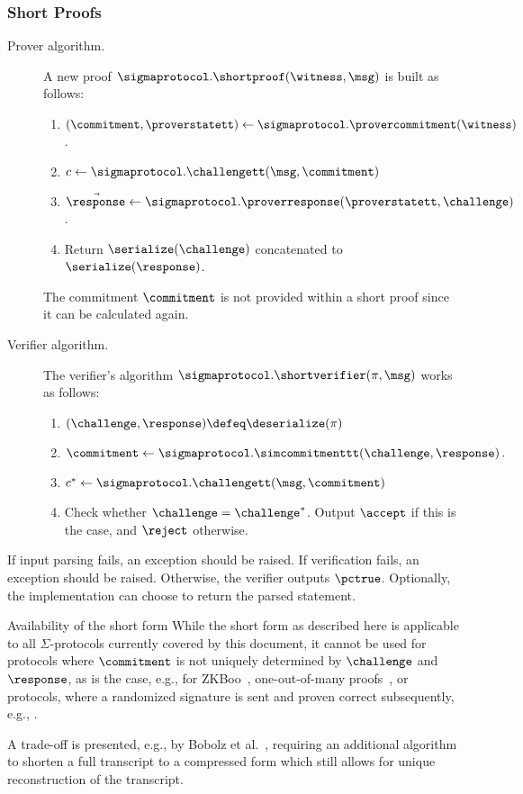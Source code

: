 \documentclass[11pt]{article}
\begin{document}
\subsubsection{Short Proofs}\label{sec:shortproof}
\begin{description}
\item[Prover algorithm.]
A new proof $\sigmaprotocol.\shortproof(\witness, \msg)$ is built as follows:
\begin{enumerate}
  \item
     $(\commitment,\proverstatett)\gets\sigmaprotocol.\provercommitment(\witness)$.
  \item
   $c \gets \sigmaprotocol.\challengett(\msg,  \commitment)$
  \item
     $\vec \response\gets\sigmaprotocol.\proverresponse(\proverstatett,\challenge)$.
  \item
  Return $\serialize(\challenge)$ concatenated to $\serialize(\response)$.
\end{enumerate}
The commitment $\commitment$ is not provided within a short proof since it can be calculated again.
\item[Verifier algorithm.] The verifier's algorithm $\sigmaprotocol.\shortverifier(\pi, \msg)$ works as follows:
\begin{enumerate}
  \item $(\challenge, \response) \defeq \deserialize(\pi)$
  \item $\commitment \gets \sigmaprotocol.\simcommitmenttt(\challenge, \response)\,.$
  \item $c^* \gets \sigmaprotocol.\challengett(\msg, \commitment)$
  \item
  Check whether $\challenge=\challenge^*$.
  Output $\accept$ if this is the case, and $\reject$ otherwise.
\end{enumerate}
\end{description}

If input parsing fails, an exception should be raised.
If verification fails, an exception should be raised.
Otherwise, the verifier outputs $\pctrue$. Optionally, the implementation can choose to return the parsed statement.

\begin{remark}{Availability of the short form}{}
  While the short form as described here is applicable to all $\Sigma$-protocols currently covered by this document, it cannot be used for protocols where $\commitment$ is not uniquely determined by $\challenge$ and $\response$, as is the case, e.g., for ZKBoo~\cite{USENIX:GiaMadOrl16}, one-out-of-many proofs~\cite{EC:GroKoh15}, or protocols, where a randomized signature is sent and proven correct subsequently, e.g., \cite{RSA:PoiSan16,AC:CamChaShe08}.

  A trade-off is presented, e.g., by Bobolz et al.~\cite{EPRINT:BEHF21}, requiring an additional algorithm to shorten a full transcript to a compressed form which still allows for unique reconstruction of the transcript.
\end{remark}
\end{document}
